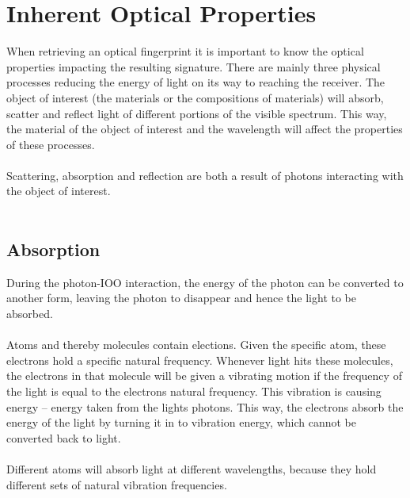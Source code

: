 \section{Inherent Optical Properties}
When retrieving an optical fingerprint it is important to know the optical properties impacting the resulting signature. There are mainly three physical processes reducing the energy of light on its way to reaching the receiver. The object of interest (the materials or the compositions of materials) will absorb, scatter and reflect light of different portions of the visible spectrum. This way, the material of the object of interest and the wavelength will affect the properties of these processes. 
\\\\
Scattering, absorption and reflection are both a result of photons interacting with the object of interest. 
\\\\
\subsection{Absorption}
During the photon-IOO interaction, the energy of the photon can be converted to another form, leaving the photon to disappear and hence the light to be absorbed. 
\\\\
Atoms and thereby molecules contain elections. Given the specific atom, these electrons hold a specific natural frequency. Whenever light hits these molecules, the electrons in that molecule will be given a vibrating motion if the frequency of the light is equal to the electrons natural frequency. This vibration is causing energy – energy taken from the lights photons. This way, the electrons absorb the energy of the light by turning it in to vibration energy, which cannot be converted back to light. 
\\\\
Different atoms will absorb light at different wavelengths, because they hold different sets of natural vibration frequencies. 


